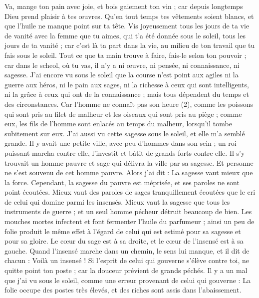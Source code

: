 \begin{multicols}{2}
Va, mange ton pain avec joie, et bois gaiement ton vin ; car depuis longtemps Dieu prend plaisir à tes œuvres.
Qu’en tout temps tes vêtements soient blancs, et que l’huile ne manque point sur ta tête.
Vis joyeusement tous les jours de ta vie de vanité avec la femme que tu aimes, qui t’a été donnée sous le soleil, tous les jours de ta vanité ; car c'est là ta part dans la vie, au milieu de ton travail que tu fais sous le soleil.
Tout ce que ta main trouve à faire, fais-le selon ton pouvoir ; car dans le scheol, où tu vas, il n'y a ni œuvre, ni pensée, ni connaissance, ni sagesse.
J’ai encore vu sous le soleil que la course n'est point aux agiles ni la guerre aux héros, ni le pain aux sages, ni la richesse à ceux qui sont intelligents, ni la grâce à ceux qui ont de la connaissance ; mais tous dépendent du temps et des circonstances.
Car l'homme ne connaît pas son heure\FTNT{} (2), comme les poissons qui sont pris au filet de malheur et les oiseaux qui sont pris au piège ; comme eux, les fils de l’homme sont enlacés au temps du malheur, lorsqu'il tombe subitement sur eux.
J'ai aussi vu cette sagesse sous le soleil, et elle m'a semblé grande.
Il y avait une petite ville, avec peu d’hommes dans son sein ; un roi puissant marcha contre elle, l’investit et bâtit de grands forts contre elle.
Il s'y trouvait un homme pauvre et sage qui délivra la ville par sa sagesse. Et personne ne s'est souvenu de cet homme pauvre.
Alors j'ai dit : La sagesse vaut mieux que la force. Cependant, la sagesse du pauvre est méprisée, et ses paroles ne sont point écoutées.
Mieux vaut des paroles de sages tranquillement écoutées que le cri de celui qui domine parmi les insensés.
Mieux vaut la sagesse que tous les instruments de guerre ; et un seul homme pécheur détruit beaucoup de bien.
\VerseOne{}Les mouches mortes infectent et font fermenter l’huile du parfumeur ; ainsi un peu de folie produit le même effet à l'égard de celui qui est estimé pour sa sagesse et pour sa gloire.
Le cœur du sage est à sa droite, et le cœur de l’insensé est à sa gauche.
Quand l’insensé marche dans un chemin, le sens lui manque, et il dit de chacun : Voilà un insensé !
Si l'esprit de celui qui gouverne s'élève contre toi, ne quitte point ton poste ; car la douceur prévient de grands péchés.
Il y a un mal que j'ai vu sous le soleil, comme une erreur provenant de celui qui gouverne :
La folie occupe des postes très élevés, et des riches sont assis dans l’abaissement.

\end{multicols}
